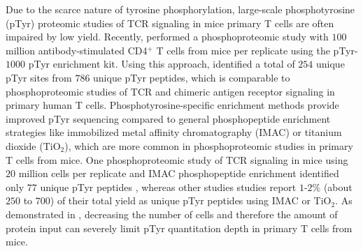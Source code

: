 \documentclass[journal=jprobs,manuscript=article]{achemso}
\begin{document}

Due to the scarce nature of tyrosine phosphorylation, large-scale phosphotyrosine (pTyr) proteomic studies of TCR signaling in mice primary T cells are often impaired by low yield. Recently, \citeauthor{locard2020lymphoatlas} performed a phosphoproteomic study with $100$ million antibody-stimulated CD4$^{+}$ T cells from mice per replicate using the pTyr-$1000$ pTyr enrichment kit. Using this approach, \citeauthor{locard2020lymphoatlas} identified a total of $254$ unique pTyr sites from $786$ unique pTyr peptides, which is comparable to phosphoproteomic studies of TCR and chimeric antigen receptor signaling in primary human T cells\cite{joshi2017phosphoproteomics,salter2021comparative,ramello2019immunoproteomic}. Phosphotyrosine-specific enrichment methods provide improved pTyr sequencing compared to general phosphopeptide enrichment strategies like immobilized metal affinity chromatography (IMAC) or titanium dioxide (TiO$_{2}$), which are more common in phosphoproteomic studies in primary T cells from mice\cite{navarro2011phosphoproteomic,prado2021synergistic}. One phosphoproteomic study of TCR signaling in mice using $20$ million cells per replicate and IMAC phosphopeptide enrichment identified only $77$ unique pTyr peptides \cite{iwai2010quantitative}, whereas other studies studies report $1$-$2\%$ (about $250$ to $700$) of their total yield as unique pTyr peptides using IMAC or TiO$_{2}$\cite{alvarez202023,navarro2011phosphoproteomic}. As demonstrated in \citeauthor{iwai2010quantitative}, decreasing the number of cells and therefore the amount of protein input can severely limit pTyr quantitation depth in primary T cells from mice. 


\end{document}
